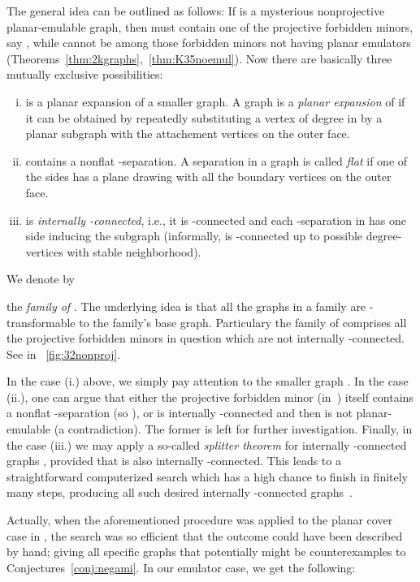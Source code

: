 \documentclass[envcountsect,envcountsame]{llncs}
\begin{document}
The general idea can be outlined as follows:
If  is a mysterious nonprojective planar-emulable graph,
then  must contain one of the projective forbidden minors, say ,
while  cannot be among those forbidden minors not having planar emulators
(Theorems~\ref{thm:2kgraphs},~\ref{thm:K35noemul}).
Now there are basically three mutually exclusive possibilities:
\begin{enumerate}[i.]\vspace{-3pt}
\item
 is a planar expansion of a smaller graph.
A graph  is a \emph{planar expansion} of  if it can be obtained by
repeatedly substituting a vertex of degree  in  
by a planar subgraph with the attachement vertices on the outer face. 
\item
 contains a nonflat -separation.
A separation in a graph is called {\em flat} if one of the sides
has a plane drawing with all the boundary vertices on the outer face.
\item
 is {\em internally -connected}, i.e.,
it is -connected and each -separation in  has one side inducing the
subgraph 
(informally,  is -connected up to possible degree- vertices
with stable neighborhood).
\end{enumerate}

We denote by

the {\em family of }.
The underlying idea is that all the graphs in a family
are -transformable to the family's base graph.
Particulary the family of  comprises all the projective
forbidden minors in question which are not internally -connected.
See in \figurename~\ref{fig:32nonproj}.

In the case (i.) above, we simply pay attention to the smaller graph .
In the case (ii.), one can argue that either the projective forbidden minor
 (in~) itself contains a nonflat -separation (so
),
or  is internally -connected and  then is not planar-emulable 
(a contradiction).
The former is left for further investigation.
Finally, in the case (iii.) we may apply a so-called {\em splitter theorem}
for internally -connected graphs \cite{cit:splitter},
provided that  is also internally -connected.
This leads to a straightforward computerized search which has a
high chance to finish in finitely many steps,
producing all such desired internally -connected graphs~.

Actually, when the aforementioned procedure was applied to the planar cover
case in \cite{cit:counterex}, the search was so efficient that the outcome
could have been described by hand; giving all  specific graphs that
potentially might be counterexamples to Conjectures~\ref{conj:negami}.
In our emulator case, we get the following:
\end{document}
